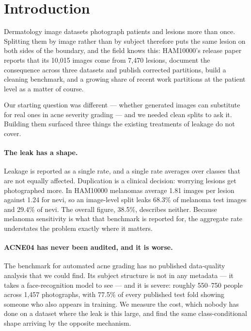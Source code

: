 \documentclass[11pt]{article}
\begin{document}
\section{Introduction}

Dermatology image datasets photograph patients and lesions more than once. Splitting them
by image rather than by subject therefore puts the same lesion on both sides of the
boundary, and the field knows this: HAM10000's release paper reports that its 10{,}015
images come from 7{,}470 lesions, \citet{fitzpatrick_audit2024} document the consequence
across three datasets and publish corrected partitions, \citet{cleanpatrick2025} build a
cleaning benchmark, and a growing share of recent work partitions at the patient level as a
matter of course.

Our starting question was different --- whether generated images can substitute for real
ones in acne severity grading --- and we needed clean splits to ask it. Building them
surfaced three things the existing treatments of leakage do not cover.

\paragraph{The leak has a shape.} Leakage is reported as a single rate, and a single rate
averages over classes that are not equally affected. Duplication is a clinical decision:
worrying lesions get photographed more. In HAM10000 melanomas average 1.81 images per
lesion against 1.24 for nevi, so an image-level split leaks 68.3\% of melanoma test images
and 29.4\% of nevi. The overall figure, 38.5\%, describes neither. Because melanoma
sensitivity is what that benchmark is reported for, the aggregate rate understates the
problem exactly where it matters.

\paragraph{ACNE04 has never been audited, and it is worse.} The benchmark for automated
acne grading has no published data-quality analysis that we could find. Its subject
structure is not in any metadata --- it takes a face-recognition model to see --- and it is
severe: roughly 550--750 people across 1{,}457 photographs, with 77.5\% of every published
test fold showing someone who also appears in training. We measure the cost, which nobody
has done on a dataset where the leak is this large, and find the same class-conditional
shape arriving by the opposite mechanism.
\end{document}
